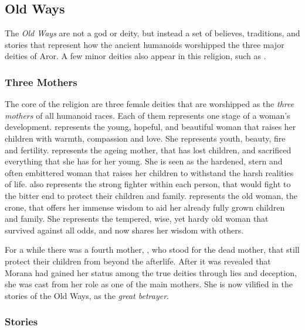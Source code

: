 \subsection{Old Ways}
\label{sec:Old Ways}

The \emph{Old Ways} are not a god or deity, but instead a set of believes,
traditions, and stories that represent how the ancient humanoids worshipped
the three major deities of Aror. A few minor deities also appear in this
religion, such as .

\subsubsection{Three Mothers}
\label{sec:Three Mothers}

The core of the religion are three female deities that are worshipped as the
\emph{three mothers} of all humanoid races. Each of them represents one stage
of a woman's development.  represents the young, hopeful,
and beautiful woman that raises her children with warmth, compassion and
love. She represents youth, beauty, fire and fertility. 
represents the ageing mother, that has lost children, and sacrificed
everything that she has for her young. She is seen as the hardened, stern and
often embittered woman that raises her children to withstand the harsh
realities of life.  also represents the strong fighter
within each person, that would fight to the bitter end to protect their
children and family.  represents the old woman, the crone,
that offers her immense wisdom to aid her already fully grown children and
family. She represents the tempered, wise, yet hardy old woman that survived
against all odds, and now shares her wisdom with others.

For a while there was a fourth mother, , who stood for the
dead mother, that still protect their children from beyond the afterlife.
After it was revealed that Morana had gained her status among the true deities
through lies and deception, she was cast from her role as one of the main
mothers. She is now vilified in the stories of the Old Ways, as the
\emph{great betrayer}.

\subsubsection{Stories}


